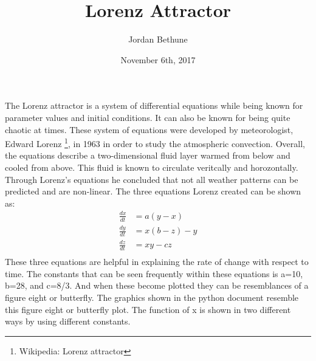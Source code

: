 \documentclass[10pt]{article}
\title{Lorenz Attractor}
\author{Jordan Bethune}
\date{November 6th, 2017}
\newcommand{\forceindent}{\leavevmode{\parindent=1em\indent}}
\begin{document}
\maketitle
\doublespace
\forceindent
The Lorenz attractor is a system of differential equations while being known for parameter values and initial conditions. It can also be known for being quite chaotic at times. These system of equations were developed by meteorologist, Edward Lorenz \footnote{Wikipedia: Lorenz attractor}, in 1963 in order to study the atmospheric convection. Overall, the equations describe a two-dimensional fluid layer warmed from below and cooled from above. This fluid is known to circulate veritcally and horozontally. Through Lorenz's equations he concluded that not all weather patterns can be predicted and are non-linear. The three equations Lorenz created can be shown as: 
\begin{align*}
\frac{dx}{dt} &= a(y-x) \\
\frac{dy}{dt} &= x(b-z)-y \\
\frac{dz}{dt} &= xy-cz \\
\end{align*}
These three equations are helpful in explaining the rate of change with respect to time. The constants that can be seen frequently within these equations is a=10, b=28, and c=8/3. And when these become plotted they can be resemblances of a figure eight or butterfly. 
\noindent The graphics shown in the python document resemble this figure eight or butterfly plot. The function of x is shown in two different ways by using different constants. 
\end{document}
